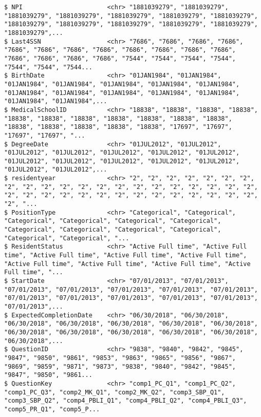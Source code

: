 \documentclass[]{article}
\begin{document}
\begin{verbatim}
$ NPI                       <chr> "1881039279", "1881039279", "1881039279", "1881039279", "1881039279", "1881039279", "1881039279", "1881039279", "1881039279", "1881039279", "1881039279", "1881039279", "1881039279",...
$ Last4SSN                  <chr> "7686", "7686", "7686", "7686", "7686", "7686", "7686", "7686", "7686", "7686", "7686", "7686", "7686", "7686", "7686", "7686", "7544", "7544", "7544", "7544", "7544", "7544", "7544...
$ BirthDate                 <chr> "01JAN1984", "01JAN1984", "01JAN1984", "01JAN1984", "01JAN1984", "01JAN1984", "01JAN1984", "01JAN1984", "01JAN1984", "01JAN1984", "01JAN1984", "01JAN1984", "01JAN1984", "01JAN1984",...
$ MedicalSchoolID           <chr> "18838", "18838", "18838", "18838", "18838", "18838", "18838", "18838", "18838", "18838", "18838", "18838", "18838", "18838", "18838", "18838", "17697", "17697", "17697", "17697", "...
$ DegreeDate                <chr> "01JUL2012", "01JUL2012", "01JUL2012", "01JUL2012", "01JUL2012", "01JUL2012", "01JUL2012", "01JUL2012", "01JUL2012", "01JUL2012", "01JUL2012", "01JUL2012", "01JUL2012", "01JUL2012",...
$ residentyear              <chr> "2", "2", "2", "2", "2", "2", "2", "2", "2", "2", "2", "2", "2", "2", "2", "2", "2", "2", "2", "2", "2", "2", "2", "2", "2", "2", "2", "2", "2", "2", "2", "2", "2", "2", "2", "2", "...
$ PositionType              <chr> "Categorical", "Categorical", "Categorical", "Categorical", "Categorical", "Categorical", "Categorical", "Categorical", "Categorical", "Categorical", "Categorical", "Categorical", "...
$ ResidentStatus            <chr> "Active Full time", "Active Full time", "Active Full time", "Active Full time", "Active Full time", "Active Full time", "Active Full time", "Active Full time", "Active Full time", "...
$ StartDate                 <chr> "07/01/2013", "07/01/2013", "07/01/2013", "07/01/2013", "07/01/2013", "07/01/2013", "07/01/2013", "07/01/2013", "07/01/2013", "07/01/2013", "07/01/2013", "07/01/2013", "07/01/2013",...
$ ExpectedCompletionDate    <chr> "06/30/2018", "06/30/2018", "06/30/2018", "06/30/2018", "06/30/2018", "06/30/2018", "06/30/2018", "06/30/2018", "06/30/2018", "06/30/2018", "06/30/2018", "06/30/2018", "06/30/2018",...
$ QuestionID                <chr> "9838", "9840", "9842", "9845", "9847", "9850", "9861", "9853", "9863", "9865", "9856", "9867", "9869", "9859", "9871", "9873", "9838", "9840", "9842", "9845", "9847", "9850", "9861...
$ QuestionKey               <chr> "comp1_PC_Q1", "comp1_PC_Q2", "comp1_PC_Q3", "comp2_MK_Q1", "comp2_MK_Q2", "comp3_SBP_Q1", "comp3_SBP_Q2", "comp4_PBLI_Q1", "comp4_PBLI_Q2", "comp4_PBLI_Q3", "comp5_PR_Q1", "comp5_P...

\end{verbatim}
\end{document}
